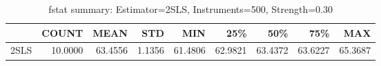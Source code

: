 \begin{table}[ht]
\centering
\caption{fstat summary: Estimator=2SLS, Instruments=500, Strength=0.30}
\begin{tabular}{lrrrrrrrr}
\toprule
 & COUNT & MEAN & STD & MIN & 25\% & 50\% & 75\% & MAX \\
\midrule
2SLS & 10.0000 & 63.4556 & 1.1356 & 61.4806 & 62.9821 & 63.4372 & 63.6227 & 65.3687 \\
\bottomrule
\end{tabular}
\end{table}
